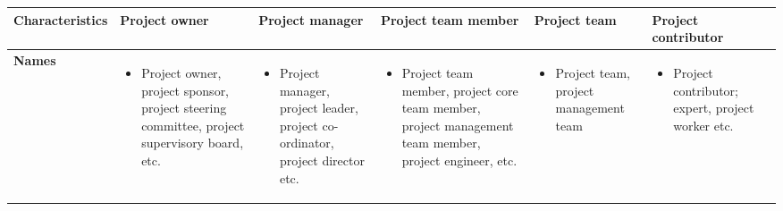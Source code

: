 \begin{table}
\captionsetup{font=scriptsize}
\centering
\tiny
    \begin{tabularx}{22cm}{X X X X X X r}
        
        \hline
        \textbf{Characteristics} & 
        \textbf{Project owner} & 
        \textbf{Project manager} & 
        \textbf{Project team member} & 
        \textbf{Project team} & 
        \textbf{Project contributor} &
         \\ 
        
        \midrule
        \textbf{Names} & 
        \begin{itemize}[noitemsep,topsep=0pt, leftmargin=0pt]
            \item Project owner, project sponsor, project steering committee, project supervisory board, etc. 
        \end{itemize} & 
        \begin{itemize}[noitemsep,topsep=0pt, leftmargin=0pt]
            \item Project manager, project leader, project co-ordinator, project director etc. 
        \end{itemize} & 
        \begin{itemize}[noitemsep,topsep=0pt, leftmargin=0pt]
            \item Project team member, project core team member, project management team member, project engineer, etc. 
        \end{itemize} & 
        \begin{itemize}[noitemsep,topsep=0pt, leftmargin=0pt]
            \item Project team, project management team 
        \end{itemize} & 
        \begin{itemize} [noitemsep,topsep=0pt, leftmargin=0pt]
            \item Project contributor; expert, project worker etc. 
        \end{itemize} & 
         \\
             

\end{tabularx}
\end{table}

